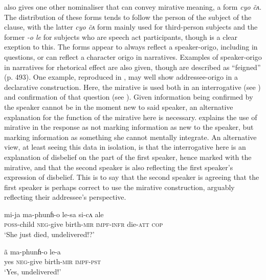  also gives one other nominaliser that can convey mirative meaning, a form \textit{cyo \~ cʌ}. The distribution of these forms tends to follow the person of the subject of the clause, with the latter \textit{cyo \~ cʌ} form mainly used for third-person subjects and the former \textit{-o le} for subjects who are speech act participants, though  is a clear exeption to this. The forms appear to always reflect a speaker-origo, including in questions, or can reflect a character origo in narratives. Examples of speaker-origo in narratives for rhetorical effect are also given, though are described as ``feigned'' (p. 493). One example, reproduced in , may well show addressee-origo in a declarative construction. Here, the mirative is used both in an interrogative (see ) and confirmation of that question (see ). Given information being confirmed by the speaker cannot be in the moment new to said speaker, an alternative explanation for the function of the mirative here is necessary.  explains the use of mirative in the response as not marking information as new to the speaker, but marking information as something she cannot mentally integrate. An alternative view, at least seeing this data in isolation, is that the interrogative here is an explanation of disbelief on the part of the first speaker, hence marked with the mirative, and that the second speaker is also reflecting the first speaker's expression of disbelief. This is to say that the second speaker is agreeing that the first speaker is perhaps correct to use the mirative construction, arguably reflecting their addressee's perspective.

\begin{exe}
  \ex \label{e:Methods:MagarMirativeAddOri}
  \begin{xlist}
    \ex \label{e:Methods:MagarMirativeAddOri:q}
    \gll mi-ja ma-phunɦ-o le-sa si-cʌ ale \\
    \textsc{poss}-child \textsc{neg}-{give birth}-\textsc{mir} \textsc{impf-infr} die-\textsc{att} \textsc{cop} \\
    \glt `She just died, undelivered!?'

    \ex \label{e:Methods:MagarMirativeAddOri:a}
    \gll ã ma-phunɦ-o le-a \\
    yes \textsc{neg}-{give birth}-\textsc{mir} \textsc{impf-pst} \\
    \glt `Yes, undelivered!'
  \end{xlist}
  \cite[Magar,][487]{GrunowHarsta2008}
\end{exe}

